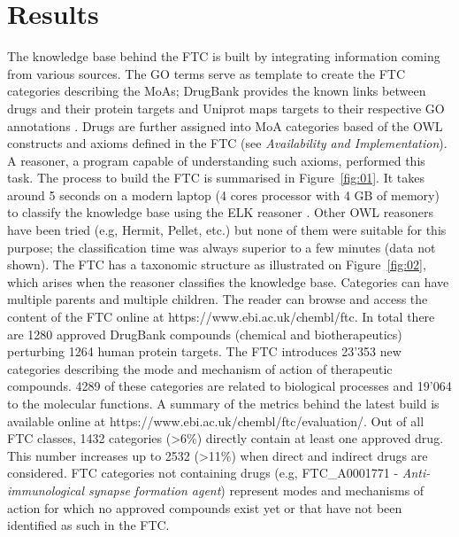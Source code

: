 \documentclass{bioinfo}
\begin{document}
\section{Results}

The knowledge base behind the FTC is built by integrating information coming from various sources. 
The GO terms serve as template to create the FTC categories describing the MoAs; DrugBank \citep{Knox2011} provides the 
known links between drugs and their protein targets and Uniprot \citep{TheUniprotConsortium2013} maps targets to their 
respective GO annotations \citep{Dimmer2012}. 
Drugs are further assigned into MoA categories based of the OWL constructs and axioms defined in the 
FTC (see \emph{Availability and Implementation}). A reasoner, a program capable of understanding such axioms, performed this task. 
The process to build the FTC is summarised in Figure~\ref{fig:01}.
It takes around 5 seconds on a modern 
laptop (4 cores processor with 4 GB of memory) to classify the knowledge base using the ELK reasoner \citep{Kazakov2011}. 
Other OWL reasoners have been tried (e.g, Hermit, Pellet, etc.) but none of them were suitable for this purpose; 
the classification time was always superior to a few minutes (data not shown). The FTC has a taxonomic structure as illustrated 
on Figure~\ref{fig:02}, which arises when the reasoner classifies the knowledge base. Categories can have multiple parents and multiple children. 
The reader can browse and access the content of the FTC online at {{https://www.ebi.ac.uk/chembl/ftc}}.
In total there are 1280 approved DrugBank compounds (chemical and biotherapeutics) perturbing 1264 human protein targets. 
The FTC introduces 23'353 new categories describing the mode and mechanism of action of therapeutic compounds. 4289 of these 
categories are related to biological processes and 19'064 to the molecular functions. A summary of the metrics behind the latest 
build is available online at {{https://www.ebi.ac.uk/chembl/ftc/evaluation/}}.
Out of all FTC classes, 1432 
categories (\textgreater 6\%) directly contain at least one approved drug. This number increases up to 2532 (\textgreater 11\%) 
when direct and 
indirect drugs are considered. FTC categories not containing drugs (e.g, FTC\_A0001771 - \emph{Anti-immunological synapse 
formation agent}) represent modes and mechanisms of action for which no approved compounds exist yet or that have not been identified 
as such in the FTC.
\end{document}
